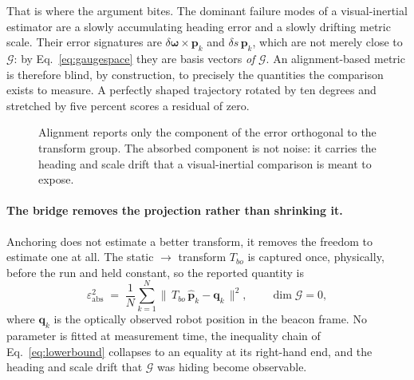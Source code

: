 That is where the argument bites. The dominant failure modes of a
visual-inertial estimator are a slowly accumulating heading error and a slowly
drifting metric scale. Their error signatures are
$\delta\boldsymbol{\omega}\times\mathbf{p}_k$ and $\delta s\,\mathbf{p}_k$,
which are not merely close to $\mathcal{G}$: by
Eq.~\ref{eq:gaugespace} they are basis vectors \emph{of} $\mathcal{G}$. An
alignment-based metric is therefore blind, by construction, to precisely the
quantities the comparison exists to measure. A perfectly shaped trajectory
rotated by ten degrees and stretched by five percent scores a residual of
zero.

\begin{figure}[htbp]
\centering
{}
\caption[Gauge subspace]{Alignment reports only the component of the error
orthogonal to the transform group. The absorbed component is not noise: it
carries the heading and scale drift that a visual-inertial comparison is
meant to expose.}
\label{fig:july30gauge}
\end{figure}

\paragraph{The bridge removes the projection rather than shrinking it.}
Anchoring does not estimate a better transform, it removes the freedom to
estimate one at all. The static  $\to$ 
transform $T_{bo}$ is captured once, physically, before the run and held
constant, so the reported quantity is
\begin{equation}
\varepsilon^{2}_{\mathrm{abs}}
  \;=\;\frac{1}{N}\sum_{k=1}^{N}
  \bigl\lVert\, T_{bo}\,\hat{\mathbf{p}}_k - \mathbf{q}_k \,\bigr\rVert^{2},
\qquad \dim\mathcal{G} = 0,
\label{eq:absoluteerror}
\end{equation}
where $\mathbf{q}_k$ is the optically observed robot position in the beacon
frame. No parameter is fitted at measurement time, the inequality chain of
Eq.~\ref{eq:lowerbound} collapses to an equality at its right-hand end, and
the heading and scale drift that $\mathcal{G}$ was hiding become observable.

